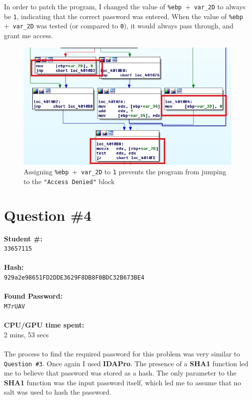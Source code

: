 \documentclass[conference]{IEEEtran}
\begin{document}
In order to patch the program, I changed the value of \texttt{\%ebp $+$ var\_2D} to always be \texttt{1}, indicating that the correct password was entered. When the value of \texttt{\%ebp $+$ var\_2D} was tested (or compared to \texttt{0}), it would always pass through, and grant me access.\\

\begin{figure}[h]
\includegraphics[width=\columnwidth]{image3.jpg}
\caption{Assigning \texttt{\%ebp $+$ var\_2D} to \texttt{1} prevents the program from jumping to the \texttt{"Access Denied"} block}
\centering
\end{figure}\mbox{}

\newpage

\section{Question \#4}
\noindent\textbf{Student \#:}\\
\texttt{33657115}\\\\
\textbf{Hash:}\\
\texttt{929a2e98651FD2DDE3629F8DB8F0BDC32B673BE4}\\\\
\textbf{Found Password:}\\
\texttt{M7rUAV}\\\\
\textbf{CPU/GPU time spent:}\\
2 mins, 53 secs\\\\

The process to find the required password for this problem was very similar to \texttt{Question \#3}. Once again I used \textbf{IDAPro}. The presence of a \textbf{SHA1} function led me to believe that password was stored as a hash. The only parameter to the \textbf{SHA1} function was the input password itself, which led me to assume that no salt was used to hash the password.\\
\end{document}
